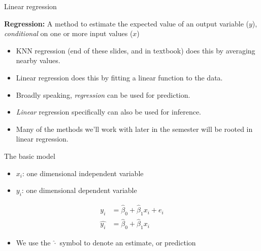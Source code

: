 \documentclass[aspectratio=169]{beamer}
\begin{document}
\begin{frame}{Linear regression}

\textbf{Regression:} A method to estimate the expected value of an output variable ($y$), \textit{conditional} on one or more input values ($x$)

\begin{itemize}
\item KNN regression (end of these slides, and in textbook) does this by averaging nearby values.

\item Linear regression does this by fitting a linear function to the data.

\item Broadly speaking, \textit{regression} can be used for prediction.

\item \textit{Linear} regression specifically can also be used for inference.

\item Many of the methods we'll work with later in the semester will be rooted in linear regression.
\end{itemize}

\end{frame}

\begin{frame}{The basic model}

\begin{itemize}
\item $x_i$: one dimensional independent variable 
\item $y_i$: one dimensional dependent variable
\end{itemize}

\begin{align*}
y_i &= \hat{\beta}_0 + \hat{\beta}_1 x_i + e_i\\
\hat{y_i} &= \hat{\beta}_0 + \hat{\beta}_1 x_i
\end{align*}

\begin{itemize}
\item We use the $\hat{\cdot}$ symbol to denote an estimate, or prediction
\end{itemize}
\end{frame}
\end{document}
